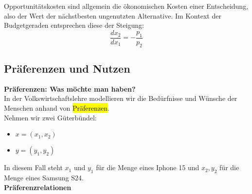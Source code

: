 \documentclass[a4paper, 10pt]{article}
\begin{document}
\begin{definitionbox}
    Opportunitätskosten sind allgemein die ökonomischen Kosten einer Entscheidung, also der Wert der nächstbesten ungenutzten Alternative. Im Kontext der
Budgetgeraden entsprechen diese der Steigung:
\begin{equation}
    \frac{dx_2}{dx_1} = - \frac{p_1}{p_2}
\end{equation}
\end{definitionbox}

\subsection{Präferenzen und Nutzen}
\textbf{Präferenzen: Was möchte man haben?}\\
In der Volkswirtschaftslehre modellieren wir die Bedürfnisse und Wünsche der Menschen anhand von \hl{Präferenzen}.\\
Nehmen wir zwei Güterbündel:
\begin{itemize}
    \item $x=(x_1,x_2)$
    \item $y = (y_1, y_2)$
\end{itemize}
In diesem Fall steht $x_1$ und $y_1$ für die Menge eines Iphone 15 und $x_2, y_2$ für die Menge eines Samsung S24.
\\[3mm]
\textbf{Präferenzrelationen}
\end{document}
